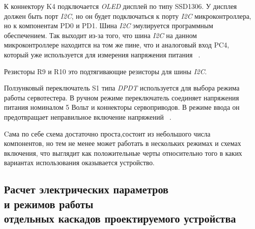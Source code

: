 К коннектору K4 подключается \textit{OLED} дисплей по типу SSD1306.  У
дисплея должен быть порт \textit{I2C}, но он будет подключаться к
порту \textit{I2C} микроконтроллера, но к компонентам PD0 и PD1. Шина
\textit{I2C} эмулируется программным обеспечением. Так выходит из-за
того, что шина \textit{I2C} на данном микроконтроллере находится на
том же пине, что и аналоговый вход PC4, который уже используется для
измерения напряжения питания ~\cite{Elector521}.

Резисторы R9 и R10 это подтягивающие резисторы для шины \textit{I2C}.

Ползунковый переключатель S1 типа \textit{DPDT} используется для
выбора режима работы сервотестера. В ручном режиме переключатель
соединяет напряжения питания номиналом 5 Вольт и коннекторы
сервоприводов. В режиме ввода он предотвращает неправильное включение
напряжений ~\cite{Elector521}.

Cама по себе схема достаточно проста,состоит из небольшого числа
компонентов, но тем не менее может работать в нескольких режимах и
схемах включения, что выглядит как положительные черты относительно
того в каких вариантах использования оказывается устройство.

\subsection{Расчет электрических параметров \\
  и режимов работы \\
  отдельных каскадов проектируемого устройства}



\newpage
